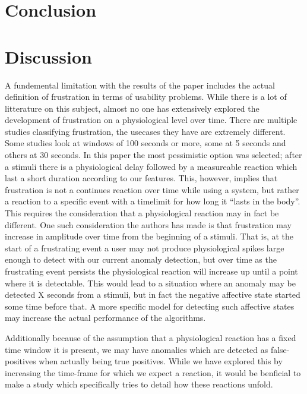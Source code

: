 
\section{Conclusion}


\section{Discussion}
A fundemental limitation with the results of the paper includes the actual definition of frustration in terms of usability problems. 
While there is a lot of litterature on this subject, almost no one has extensively explored the development of frustration on a physiological level over time. 
There are multiple studies classifying frustration, the usecases they have are extremely different. 
Some studies look at windows of 100 seconds or more, some at 5 seconds and others at 30 seconds.
In this paper the most pessimistic option was selected; after a stimuli there is a physiological delay followed by a measureable reaction which last a short duration according to our features.
This, however, implies that frustration is not a continues reaction over time while using a system, but rather a reaction to a specific event with a timelimit for how long it ``lasts in the body''.
This requires the consideration that a physiological reaction may in fact be different. 
One such consideration the authors has made is that frustration may increase in amplitude over time from the beginning of a stimuli. 
That is, at the start of a frustrating event a user may not produce physiological spikes large enough to detect with our current anomaly detection, but over time as the frustrating event persists the physiological reaction will increase up until a point where it is detectable. 
This would lead to a situation where an anomaly may be detected X seconds from a stimuli, but in fact the negative affective state started some time before that.
A more specific model for detecting such affective states may increase the actual performance of the algorithms.

Additionally because of the assumption that a physiological reaction has a fixed time window it is present, we may have anomalies which are detected as false-positives when actually being true positives. 
While we have explored this by increasing the time-frame for which we expect a reaction, it would be benficial to make a study which specifically tries to detail how these reactions unfold.

